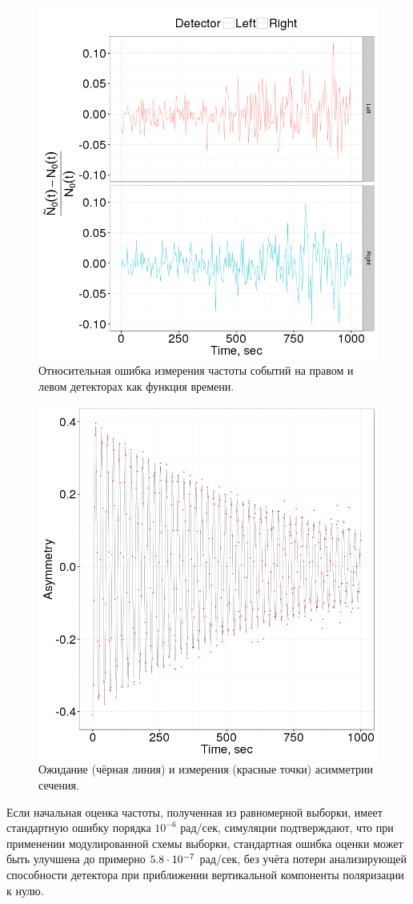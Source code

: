 \begin{figure}[H]
	\centering
	\includegraphics[width=.8\linewidth]{images/App_Stats/LR_detector_relErr}
	\caption{Относительная ошибка измерения частоты событий на правом и левом
		детекторах как функция времени.\label{fig:LRDetErr}}
\end{figure}

\begin{figure}[H]
	\centering
	\includegraphics[width=.8\linewidth]{images/App_Stats/Asymmetry}
	\caption{Ожидание (чёрная линия) и измерения (красные точки)
		асимметрии сечения.\label{fig:Asym}}
\end{figure}

Если начальная оценка частоты, полученная из равномерной выборки, 
имеет стандартную ошибку порядка $10^{-6}$ рад/сек, симуляции
подтверждают, что при применении модулированной схемы выборки, 
стандартная ошибка оценки может быть улучшена до примерно ${5.8}\cdot 10^{-7}$ рад/сек, 
без учёта потери анализирующей способности детектора
при приближении вертикальной компоненты поляризации к нулю.


